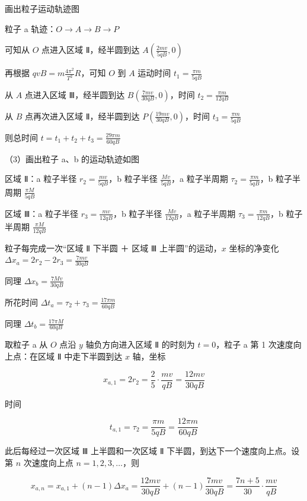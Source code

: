 \documentclass[\gkver]{gaokaozhenti}
\begin{document}
\begin{enumerate}
{画出粒子运动轨迹图


粒子 a 轨迹：$O \to A \to B \to P$

可知从 $O$ 点进入区域 Ⅱ，经半圆到达 $A\left(\frac{2mv}{5qB}, 0\right)$

再根据 $qvB = m\frac{4\pi^{2}}{T^{2}}R$，可知 $O$ 到 $A$ 运动时间 $t_{1} = \frac{\pi m}{5qB}$

从 $A$ 点进入区域 Ⅲ，经半圆到达 $B\left(\frac{7mv}{30qB}, 0\right)$，时间 $t_{2} = \frac{\pi m}{12qB}$

从 $B$ 点再次进入区域 Ⅱ，经半圆到达 $P\left(\frac{19mv}{30qB}, 0\right)$，时间 $t_{3} = \frac{\pi m}{5qB}$

则总时间 $t = t_{1} + t_{2} + t_{3} = \frac{29\pi m}{60qB}$

（3）画出粒子 a、b 的运动轨迹如图


区域 Ⅱ：a 粒子半径 $r_{2} = \frac{mv}{5qB}$，b 粒子半径 $\frac{Mv}{5qB}$，a 粒子半周期 $\tau_{2} = \frac{\pi m}{5qB}$，b 粒子半周期 $\frac{\pi M}{5qB}$

区域 Ⅲ：a 粒子半径 $r_{3} = \frac{mv}{12qB}$，b 粒子半径 $\frac{Mv}{12qB}$，a 粒子半周期 $\tau_{3} = \frac{\pi m}{12qB}$，b 粒子半周期 $\frac{\pi M}{12qB}$

粒子每完成一次“区域 Ⅱ 下半圆 ＋ 区域 Ⅲ 上半圆”的运动，$x$ 坐标的净变化 $\Delta x_{a} = 2r_{2} - 2r_{3} = \frac{7mv}{30qB}$

同理 $\Delta x_{b} = \frac{7Mv}{30qB}$

所花时间 $\Delta t_{a} = \tau_{2} + \tau_{3} = \frac{17\pi m}{60qB}$

同理 $\Delta t_{b} = \frac{17\pi M}{60qB}$

取粒子 a 从 $O$ 点沿 $y$ 轴负方向进入区域 Ⅱ 的时刻为 $t = 0$，粒子 a 第 1 次速度向上点：在区域 Ⅱ 中走下半圆到达 $x$ 轴，坐标

\[ x_{a,1} = 2r_{2} = \frac{2}{5} \cdot \frac{mv}{qB} = \frac{12mv}{30qB} \]

时间

\[ t_{a,1} = \tau_{2} = \frac{\pi m}{5qB} = \frac{12\pi m}{60qB} \]

此后每经过一次区域 Ⅲ 上半圆和一次区域 Ⅱ 下半圆，到达下一个速度向上点。设第 $n$ 次速度向上点 $n = 1, 2, 3, \ldots$，则

\[ x_{a,n} = x_{a,1} + (n - 1)\Delta x_{a} = \frac{12mv}{30qB} + (n - 1)\frac{7mv}{30qB} = \frac{7n + 5}{30} \cdot \frac{mv}{qB} \]

}
\end{enumerate}
\end{document}

